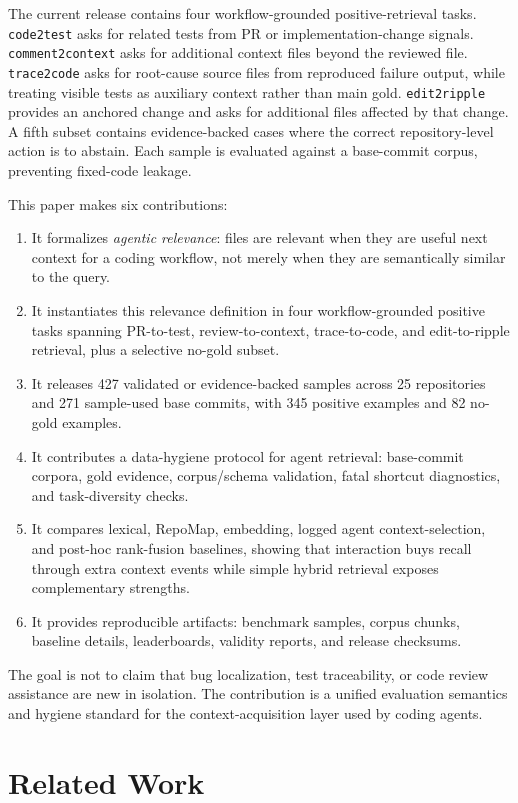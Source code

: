 \documentclass[11pt]{article}
\newcommand{\code}[1]{\texttt{#1}}
\begin{document}
The current release contains four workflow-grounded positive-retrieval tasks. \code{code2test} asks for related tests from PR or implementation-change signals. \code{comment2context} asks for additional context files beyond the reviewed file. \code{trace2code} asks for root-cause source files from reproduced failure output, while treating visible tests as auxiliary context rather than main gold. \code{edit2ripple} provides an anchored change and asks for additional files affected by that change. A fifth subset contains evidence-backed cases where the correct repository-level action is to abstain. Each sample is evaluated against a base-commit corpus, preventing fixed-code leakage.

This paper makes six contributions:
\begin{enumerate}
  \item It formalizes \emph{agentic relevance}: files are relevant when they are useful next context for a coding workflow, not merely when they are semantically similar to the query.
  \item It instantiates this relevance definition in four workflow-grounded positive tasks spanning PR-to-test, review-to-context, trace-to-code, and edit-to-ripple retrieval, plus a selective no-gold subset.
  \item It releases 427 validated or evidence-backed samples across 25 repositories and 271 sample-used base commits, with 345 positive examples and 82 no-gold examples.
  \item It contributes a data-hygiene protocol for agent retrieval: base-commit corpora, gold evidence, corpus/schema validation, fatal shortcut diagnostics, and task-diversity checks.
  \item It compares lexical, RepoMap, embedding, logged agent context-selection, and post-hoc rank-fusion baselines, showing that interaction buys recall through extra context events while simple hybrid retrieval exposes complementary strengths.
  \item It provides reproducible artifacts: benchmark samples, corpus chunks, baseline details, leaderboards, validity reports, and release checksums.
\end{enumerate}

The goal is not to claim that bug localization, test traceability, or code review assistance are new in isolation. The contribution is a unified evaluation semantics and hygiene standard for the context-acquisition layer used by coding agents.

\section{Related Work}
\end{document}
